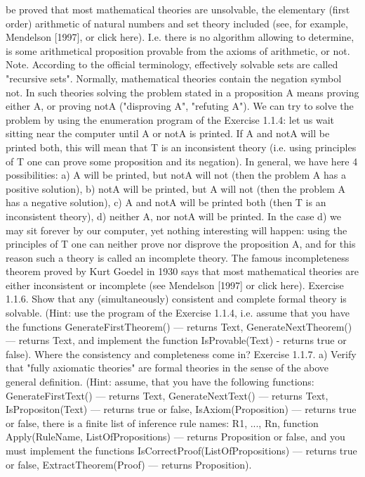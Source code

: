 be proved that most mathematical theories are unsolvable, the elementary (first order) arithmetic of
natural numbers and set theory included (see, for example, Mendelson [1997], or click here). I.e. there is
no algorithm allowing to determine, is some arithmetical proposition provable from the axioms of
arithmetic, or not.
Note. According to the official terminology, effectively solvable sets are called "recursive sets".
Normally, mathematical theories contain the negation symbol not. In such theories solving the problem
stated in a proposition A means proving either A, or proving notA ("disproving A", "refuting A"). We can
try to solve the problem by using the enumeration program of the Exercise 1.1.4: let us wait sitting near
the computer until A or notA is printed. If A and notA will be printed both, this will mean that T is an
inconsistent theory (i.e. using principles of T one can prove some proposition and its negation). In
general, we have here 4 possibilities:
a) A will be printed, but notA will not (then the problem A has a positive solution),
b) notA will be printed, but A will not (then the problem A has a negative solution),
c) A and notA will be printed both (then T is an inconsistent theory),
d) neither A, nor notA will be printed.
In the case d) we may sit forever by our computer, yet nothing interesting will happen: using the
principles of T one can neither prove nor disprove the proposition A, and for this reason such a theory is
called an incomplete theory. The famous incompleteness theorem proved by Kurt Goedel in 1930 says
that most mathematical theories are either inconsistent or incomplete (see Mendelson [1997] or click
here).
Exercise 1.1.6. Show that any (simultaneously) consistent and complete formal theory is solvable. (Hint:
use the program of the Exercise 1.1.4, i.e. assume that you have the functions GenerateFirstTheorem() ---
returns Text, GenerateNextTheorem() --- returns Text, and implement the function IsProvable(Text) -
returns true or false). Where the consistency and completeness come in?
Exercise 1.1.7. a) Verify that "fully axiomatic theories" are formal theories in the sense of the above
general definition. (Hint: assume, that you have the following functions: GenerateFirstText() --- returns
Text, GenerateNextText() --- returns Text, IsPropositon(Text) --- returns true or false, IsAxiom(Proposition) ---
returns true or false, there is a finite list of inference rule names: {R1, ..., Rn}, function Apply(RuleName,
ListOfPropositions) --- returns Proposition or false, and you must implement the functions
IsCorrectProof(ListOfPropositions) --- returns true or false, ExtractTheorem(Proof) --- returns Proposition).
